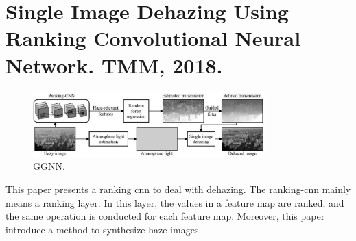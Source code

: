 \documentclass[10pt,onecolumn]{book}
\begin{document}
\section{Single Image Dehazing Using Ranking Convolutional Neural Network. TMM, 2018.}
\begin{figure}[h]
\centering
\includegraphics[width=0.8\textwidth]{figures_paper_reading/Single_Image_Dehazing_Using_Ranking_Convolutional_Neural_Network.png}
\caption{GGNN.}
\label{fig}
\end{figure}

This paper presents a ranking cnn to deal with dehazing. The ranking-cnn mainly means a ranking layer. In this layer, the values in a feature map are ranked, and the same operation is conducted for each feature map. Moreover, this paper introduce a method to synthesize haze images.

{\small


}
\end{document}

